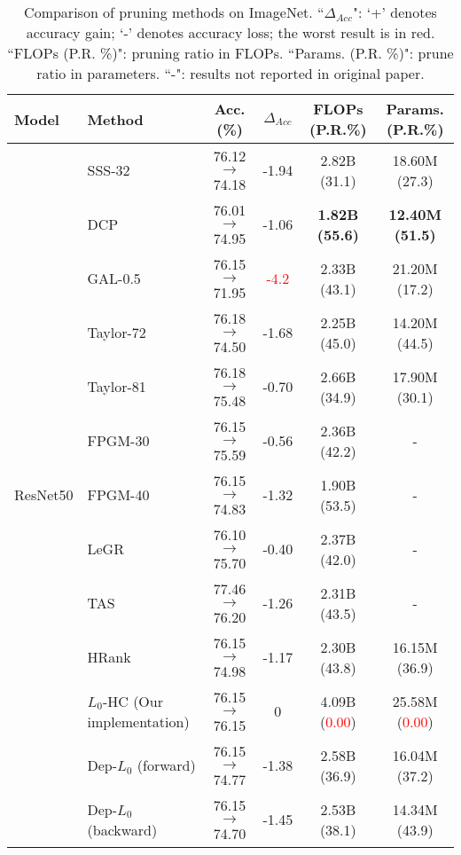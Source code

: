\documentclass[runningheads, envcountsame, a4paper]{llncs}
\begin{document}
\begin{table}[t]
  \small
  \centering
  \caption{Comparison of pruning methods on ImageNet. ``$\Delta_{Acc}$": `+' denotes accuracy gain; `-' denotes accuracy loss; the worst result is in red. ``FLOPs (P.R. \%)": pruning ratio in FLOPs. ``Params. (P.R. \%)": prune ratio in parameters. ``-": results not
   reported in original paper.}

  \begin{tabular}{l l c c c c}\toprule
    Model & Method &  Acc. (\%) & $\Delta_{Acc}$ & FLOPs (P.R.\%) & Params. (P.R.\%) \\\hline
      \multirow{13}{*}{ResNet50}  & SSS-32~\cite{huang2018data} &  76.12 $\rightarrow$ 74.18 & -1.94 & 2.82B (31.1) & 18.60M (27.3) \\
      & DCP~\cite{zhuang2018discrimination} & 76.01 $\rightarrow$ 74.95 & -1.06 & \textbf{1.82B (55.6)} & \textbf{12.40M (51.5)}\\
      & GAL-0.5~\cite{lin2019towards} & 76.15 $\rightarrow$ 71.95 & \textcolor{red}{-4.2} & 2.33B (43.1) & 21.20M (17.2) \\
      & Taylor-72~\cite{molchanov2019importance} & 76.18 $\rightarrow$ 74.50 & -1.68 & 2.25B (45.0) & 14.20M (44.5) \\
      & Taylor-81~\cite{molchanov2019importance} & 76.18 $\rightarrow$ 75.48 & -0.70 & 2.66B (34.9) & 17.90M (30.1) \\
      & FPGM-30~\cite{he2019filter} & 76.15 $\rightarrow$ 75.59 & -0.56 & 2.36B (42.2) & - \\
      & FPGM-40~\cite{he2019filter} & 76.15 $\rightarrow$ 74.83 & -1.32 & 1.90B (53.5) & - \\
      & LeGR~\cite{chin2019legr} & 76.10 $\rightarrow$ 75.70 & -0.40 & 2.37B (42.0) & - \\ 
      & TAS~\cite{dong2019network} & 77.46 $\rightarrow$ 76.20 & -1.26 & 2.31B (43.5) & - \\
      & HRank~\cite{lin2020hrank} & 76.15 $\rightarrow$ 74.98 & -1.17 & 2.30B (43.8) & 16.15M (36.9) \\
      & \cellcolor{blue!25}$L_0$-HC (Our implementation) & \cellcolor{blue!25}76.15 $\rightarrow$ 76.15 & \cellcolor{blue!25}0 & \cellcolor{blue!25}4.09B (\textcolor{red}{0.00}) & \cellcolor{blue!25}25.58M (\textcolor{red}{0.00}) \\
      & \cellcolor{blue!25}Dep-$L_0$ (forward) & \cellcolor{blue!25}76.15  $\rightarrow$ 74.77 & \cellcolor{blue!25}-1.38 & \cellcolor{blue!25}2.58B (36.9) & \cellcolor{blue!25}16.04M (37.2) \\
      & \cellcolor{blue!25}Dep-$L_0$ (backward) & \cellcolor{blue!25}76.15  $\rightarrow$ 74.70 & \cellcolor{blue!25}-1.45 & \cellcolor{blue!25}2.53B (38.1) & \cellcolor{blue!25}14.34M (43.9) \\
      \bottomrule
  \end{tabular}
  \label{tab:imagenet}
\end{table}
\end{document}
